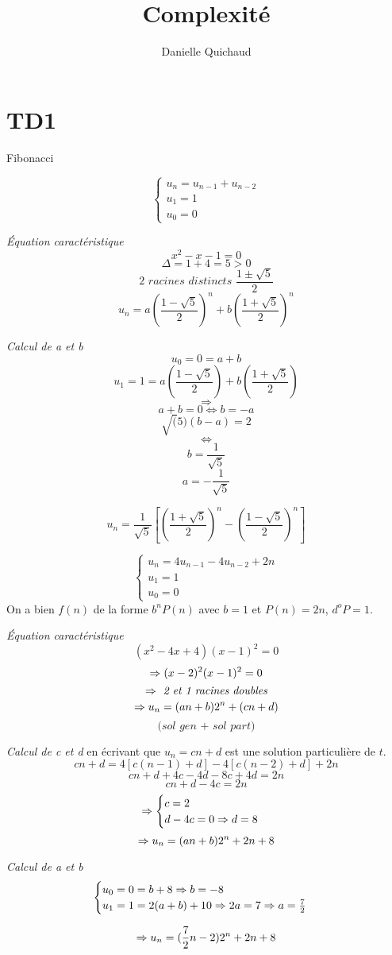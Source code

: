 \providecommand{\VarRectoVerso}{\oneside}

\title{Complexité}
\author{Danielle Quichaud}
\usepackage{amsmath}

\maketitle
\tableofcontents
\section{TD1}

\begin{exercice}{Fibonacci}

\[ \begin{cases} u_n = u_{n-1} + u_{n-2} \\ u_1 = 1 \\ u_0= 0 \end{cases} \]

\textit{Équation caractéristique} 
\[x^2-x-1 = 0\]
\[ \Delta = 1+4=5 >0 \]
\[ \textit{2 racines distincts } \frac{1 \pm \sqrt{5}}{2} \]
\[ u_n = a \left(\frac{1 - \sqrt{5}}{2}\right)^n + b \left(\frac{1 + \sqrt{5}}{2}\right)^n \]

\textit{Calcul de a et b} 
\[ u_0 = 0 = a +b \]
\[ u_1 = 1 = a \left(\frac{1 - \sqrt{5}}{2}\right) + b \left(\frac{1 + \sqrt{5}}{2}\right) \]
\[ \Rightarrow \]
\[ a + b = 0 \Leftrightarrow b = -a \]
\[ \sqrt(5) (b-a) = 2 \]
\[ \Leftrightarrow \]
\[ b = \frac{1}{\sqrt{5}} \]
\[ a = -\frac{1}{\sqrt{5}} \]

\[ u_n = \frac{1}{\sqrt{5}} \left[ \left( \frac{1 + \sqrt{5}}{2} \right)^n - \left( \frac{1 - \sqrt{5}}{2} \right)^n \right] \]


\end{exercice}

\begin{exercice}
\[ \begin{cases} u_n = 4 u_{n-1} - 4 u_{n-2} + 2 n \\ u_1 = 1 \\ u_0 = 0 \end{cases} \]
On a bien $f(n)$ de la forme $b^n P(n)$ avec $b = 1$ et $P(n) = 2n$, $d^o P = 1$.

\textit{Équation caractéristique} 
\[ (x^2-4x+4)(x-1)^2 = 0 \]
\[ \Rightarrow (x-2)^2(x-1)^2 = 0 \]
\[ \Rightarrow \textit{ 2 et 1 racines doubles} \]
\[ \Rightarrow u_n=(an+b)2^n+(cn+d) \]
\[ \textit{(sol gen + sol part)} \]

\textit{Calcul de c et d} en écrivant que $u_n=cn+d$ est une solution particulière de $t$.
\[ cn+d=4[c(n-1)+d]-4[c(n-2)+d]+2n \] 
\[ cn+d+4c-4d-8c+4d=2n \]
\[ cn+d-4c=2n \]
\[ \Rightarrow \begin{cases} c=2 \\ d-4c=0 \Rightarrow d=8 \end{cases} \]
\[ \Rightarrow u_n=(an+b)2^n+2n+8 \]

\textit{Calcul de a et b}
\[ \begin{cases} u_0=0=b+8 \Rightarrow b=-8 \\u_1=1=2(a+b)+10 \Rightarrow 2a=7 \Rightarrow a=\frac{7}{2} \end{cases} \]

\[ \Rightarrow u_n=(\frac{7}{2}n-2)2^n+2n+8 \]

\end{exercice}

